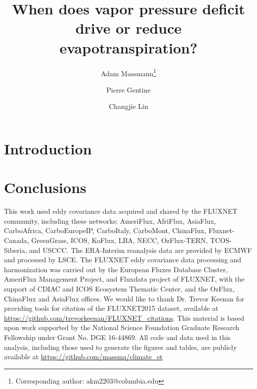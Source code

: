 \documentclass[12pt]{article}
\begin{document}
\title{When does vapor pressure deficit drive or reduce
  evapotranspiration?}

\author[1]{Adam Massmann\thanks{Corresponding author: akm2203@columbia.edu}}
\author[1]{Pierre Gentine}
\author[1,2]{Changjie Lin}


\maketitle
\begin{abstract}
  
\end{abstract}

\onehalfspacing

\section{Introduction}





\section{Conclusions}



\acknowledgments This work used eddy covariance data acquired and shared
by the FLUXNET community, including these networks: AmeriFlux, AfriFlux,
AsiaFlux, CarboAfrica, CarboEuropeIP, CarboItaly, CarboMont,
ChinaFlux, Fluxnet-Canada, GreenGrass, ICOS, KoFlux, LBA, NECC,
OzFlux-TERN, TCOS-Siberia, and USCCC. The ERA-Interim reanalysis data
are provided by ECMWF and processed by LSCE. The FLUXNET eddy covariance
data processing and harmonization was carried out by the European Fluxes
Database Cluster, AmeriFlux Management Project, and Fluxdata project of
FLUXNET, with the support of CDIAC and ICOS Ecosystem Thematic Center,
and the OzFlux, ChinaFlux and AsiaFlux offices. We would like to thank
Dr. Trevor Keenan for providing tools for citation of the FLUXNET2015
dataset, available at
\url{https://github.com/trevorkeenan/FLUXNET_citations}. This material is
based upon work supported by the National Science Foundation Graduate
Research Fellowship under Grant No. DGE 16-44869. All code and data used
in this analysis, including those used to generate the figures and
tables, are publicly available at \url{https://github.com/massma/climate\_et}


\end{document}
